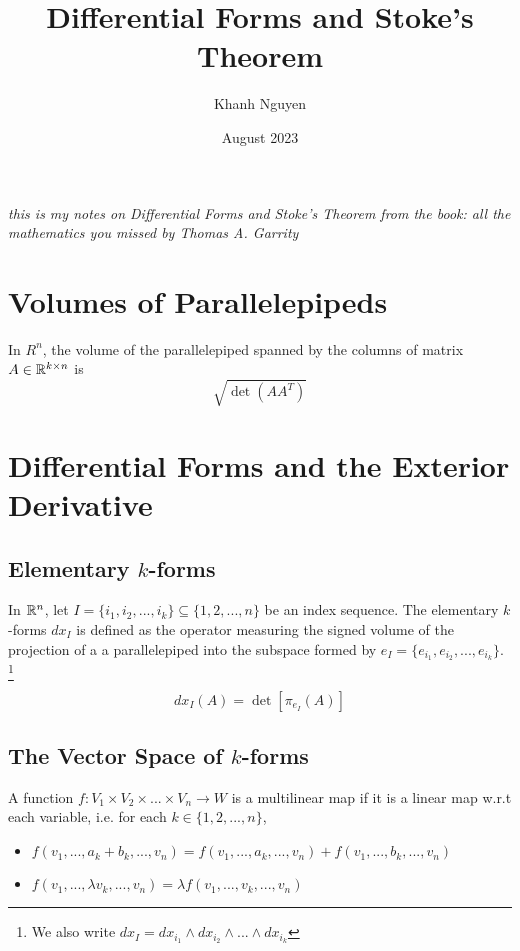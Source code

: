 \documentclass{article}
\title{
    Differential Forms and Stoke's Theorem
}
\author{Khanh Nguyen}
\date{August 2023}
\begin{document}
\maketitle

\emph{this is my notes on Differential Forms and Stoke's Theorem from the book: all the mathematics you missed by Thomas A. Garrity}

\section{Volumes of Parallelepipeds}

\begin{theorem}
    In $R^n$, the volume of the parallelepiped spanned by the columns of matrix $A \in \mathbb{R}^{k \times n}$ is
    $$
        \sqrt{\det (A A^T)}
    $$
\end{theorem}

\section{Differential Forms and the Exterior Derivative}

\subsection{Elementary $k$-forms}

In $\mathbb{R}^n$, let $I = \{i_1, i_2, ..., i_k \} \subseteq \{1, 2, ..., n\}$ be an index sequence. The elementary $k$-forms $dx_I$ is defined as the operator measuring the signed volume of the projection of a a parallelepiped into the subspace formed by $e_I = \{e_{i_1}, e_{i_2}, ..., e_{i_k} \}$. \footnote{We also write $dx_I = dx_{i_1} \wedge dx_{i_2} \wedge ... \wedge dx_{i_k}$}

$$
    dx_I(A) = \det \left[ \pi_{e_I}(A) \right]
$$


\subsection{The Vector Space of $k$-forms}

\begin{definition}
    A function $f: V_1 \times V_2 \times ... \times V_n \to  W$ is a multilinear map if it is a linear map w.r.t each variable, i.e. for each $k \in \{1, 2, ..., n\}$,
    \begin{itemize}
        \item $f(v_1, ..., a_k + b_k, ..., v_n) = f(v_1, ..., a_k, ..., v_n) + f(v_1, ..., b_k, ..., v_n)$
        \item $f(v_1, ..., \lambda v_k, ..., v_n) = \lambda f(v_1, ..., v_k, ..., v_n)$
    \end{itemize}
\end{definition}
\end{document}
